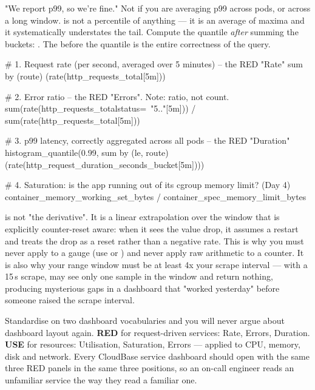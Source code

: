 \begin{misconception}
"We report p99, so we're fine." Not if you are averaging p99 across pods, or across a long window.  is not a percentile of anything --- it is an average of maxima and it systematically understates the tail. Compute the quantile \emph{after} summing the buckets: . The  before the quantile is the entire correctness of the query.
\end{misconception}

\begin{bashbox}
# 1. Request rate (per second, averaged over 5 minutes) -- the RED "Rate"
sum by (route) (rate(http_requests_total[5m]))

# 2. Error ratio -- the RED "Errors". Note: ratio, not count.
sum(rate(http_requests_total{status=~"5.."}[5m]))
  / sum(rate(http_requests_total[5m]))

# 3. p99 latency, correctly aggregated across all pods -- the RED "Duration"
histogram_quantile(0.99,
  sum by (le, route) (rate(http_request_duration_seconds_bucket[5m])))

# 4. Saturation: is the app running out of its cgroup memory limit? (Day 4)
container_memory_working_set_bytes / container_spec_memory_limit_bytes
\end{bashbox}

\begin{seniornote}
 is not "the derivative". It is a linear extrapolation over the window that is explicitly counter-reset aware: when it sees the value drop, it assumes a restart and treats the drop as a reset rather than a negative rate. This is why you must never apply  to a gauge (use  or ) and never apply raw arithmetic to a counter. It is also why your range window must be at least 4x your scrape interval --- with a 15\,s scrape,  may see only one sample in the window and return nothing, producing mysterious gaps in a dashboard that "worked yesterday" before someone raised the scrape interval.
\end{seniornote}

\begin{prodtip}
Standardise on two dashboard vocabularies and you will never argue about dashboard layout again. \textbf{RED} for request-driven services: Rate, Errors, Duration. \textbf{USE} for resources: Utilisation, Saturation, Errors --- applied to CPU, memory, disk and network. Every CloudBase service dashboard should open with the same three RED panels in the same three positions, so an on-call engineer reads an unfamiliar service the way they read a familiar one.
\end{prodtip}


